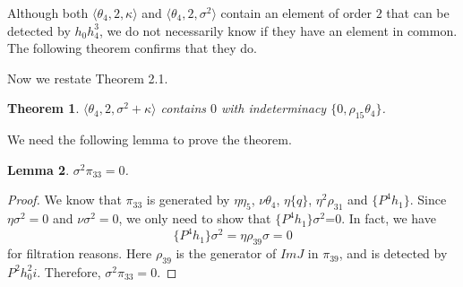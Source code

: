 \documentclass[psamsfonts]{amsart}
\newtheorem{thm}{Theorem}[section]
\newtheorem{lem}[thm]{Lemma}
\theoremstyle{definition}
\numberwithin{equation}{section}
\begin{document}
Although both $\langle \theta_4, 2, \kappa\rangle$ and $\langle \theta_4, 2, \sigma^2\rangle$ contain an element of order $2$ that can be detected by $h_0h_4^3$, we do not necessarily know if they have an element in common. The following theorem confirms that they do.

Now we restate Theorem 2.1.

\begin{thm}
$\langle \theta_4, 2, \sigma^2+\kappa\rangle$ contains $0$ with indeterminacy $\{0, \rho_{15}\theta_4\}$.
\end{thm}

We need the following lemma to prove the theorem.

\begin{lem}
$\sigma^2\pi_{33}=0$.
\end{lem}

\begin{proof}
We know that $\pi_{33}$ is generated by $\eta\eta_5$, $\nu\theta_4$, $\eta\{q\}$, $\eta^2\rho_{31}$ and $\{P^4h_1\}$. Since $\eta\sigma^2=0$ and $\nu\sigma^2=0$, we only need to show that $\{P^4h_1\}\sigma^2$=0. In fact, we have
$$\{P^4h_1\}\sigma^2=\eta\rho_{39}\sigma=0$$
for filtration reasons. Here $\rho_{39}$ is the generator of $ImJ$ in $\pi_{39}$, and is detected by $P^2h_0^2i$. Therefore, $\sigma^2\pi_{33}=0$.
\end{proof}






\end{document}
